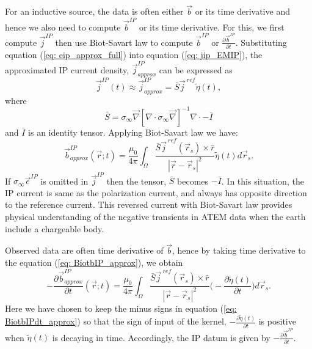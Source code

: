 \documentclass[a4paper, 11pt]{article}
\renewcommand{\div}{\nabla\cdot}
\newcommand{\grad}{\vec \nabla}
\newcommand{\siginf}{\sigma_\infty}
\renewcommand {\j}  { {\vec j} }
\renewcommand {\b}  { {\vec b} }
\newcommand {\e}  { {\vec e} }
\newcommand{\peta}{\tilde{\eta}}
\newcommand{\jref}{\j^{\ ref}}
\begin{document}
For an inductive source, the data is often either $\b$ or its time derivative and hence we also need to compute $\b^{IP}$ or its time derivative.
For this, we first compute $\j^{IP}$ then use Biot-Savart law to compute $\b^{IP}$ or $\frac{\partial \b^{IP}}{\partial t}$. 
Substituting equation (\ref{eq: eip_approx_full}) into equation (\ref{eq: jip_EMIP}), the approximated IP current density, $\j^{IP}_{approx}$ can be expressed as
\begin{equation}
  \j^{IP}(t) \approx \j^{IP}_{approx} = \bar{S}\jref\peta(t),
  \label{eq: jip_approx}
\end{equation}
where
\begin{equation}
  \bar{S} = \siginf\grad[\div \siginf\grad]^{-1}\div-\bar{I}
\end{equation}
and $\bar{I}$ is an identity tensor. 
Applying Biot-Savart law we have:
\begin{equation}
  \b^{IP}_{approx}(\vec{r}; t) = \frac{\mu_0}{4\pi}\int_{\Omega}  \frac{\bar{S}\j^{\ ref}(\vec{r}_s)\times\hat{r}}{|\vec{r}-\vec{r}_s|^2}\peta(t)d\vec{r}_s.
  \label{eq: BiotbIP_approx}
\end{equation}
If $\siginf\e^{IP}$ is omitted in  $\j^{IP}$ then the tensor, $\bar{S}$ becomes $-\bar{I}$. 
In this situation, the IP current is same as the polarization current, and always has opposite direction to the reference current. 
This reversed current with Biot-Savart law provides physical understanding of the negative transients in ATEM data when the earth include a chargeable body. 

Observed data are often time derivative of $\b$, hence by taking time derivative to the equation (\ref{eq: BiotbIP_approx}), we obtain
\begin{equation}
  -\frac{\partial\b^{IP}_{approx}}{\partial t}(\vec{r}; t) = \frac{\mu_0}{4\pi} \int_{\Omega}  \frac{\bar{S}\jref(\vec{r}_s)\times\hat{r}}{|\vec{r}-\vec{r}_s|^2} \Big( -\frac{\partial \peta(t)}{\partial t} \Big) d\vec{r}_s.
  \label{eq: BiotbIPdt_approx}
\end{equation}
Here we have chosen to keep the minus signs in equation (\ref{eq: BiotbIPdt_approx}) so that the sign of input of the kernel, $-\frac{\partial \peta(t)}{\partial t}$ is positive when $\peta(t)$ is decaying in time. 
Accordingly, the IP datum is given by  $-\frac{\partial\b^{IP}}{\partial t}$. 
\end{document}
